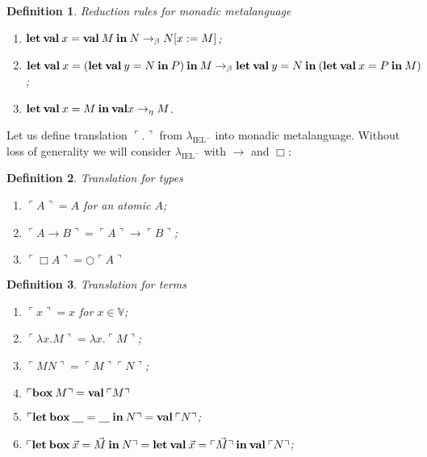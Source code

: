 \documentclass[a4paper]{article}
\newtheorem{defin}{Definition}
\begin{document}
\begin{defin} Reduction rules for monadic metalanguage
  \begin{enumerate}
    \item ${\bf let \: val \:} x = {\bf val \:} M {\: \bf in \:} N \rightarrow_{\beta} N [x := M]$;
    \item ${\bf let \: val \:} x = ({\bf let \: val \:} y = N {\: \bf in \:} P) {\: \bf in \:} M \rightarrow_{\beta} {\bf let \: val \:} y = N {\: \bf in \:} ({\bf let \: val \:} x = P {\: \bf in \:} M)$;
    \item ${\bf let \: val \:} x = M {\: \bf in \:} {\bf val} x \rightarrow_{\eta} M$.
  \end{enumerate}
\end{defin}

Let us define translation $\ulcorner . \urcorner$ from $\lambda_{\text{IEL}^{-}}$ into monadic metalanguage.
Without loss of generality we will consider $\lambda_{\text{IEL}^{-}}$ with $\to$ and $\Box$:

\begin{defin} Translation for types
  \begin{enumerate}
    \item $\ulcorner A \urcorner = A$ for an atomic $A$;
    \item $\ulcorner A \to B \urcorner = \ulcorner A \urcorner \to \ulcorner B \urcorner$;
    \item $\ulcorner \Box A \urcorner = \bigcirc \ulcorner A \urcorner$
  \end{enumerate}
\end{defin}

\begin{defin} Translation for terms
  \begin{enumerate}
    \item $\ulcorner x \urcorner = x$ for $x \in \mathbb{V}$;
    \item $\ulcorner \lambda x. M \urcorner = \lambda x. \ulcorner M \urcorner$;
    \item $\ulcorner M N \urcorner = \ulcorner M \urcorner \ulcorner N \urcorner$;
    \item $\ulcorner {\bf box \:} M \urcorner = {\bf val \:} \ulcorner M \urcorner$
    \item $\ulcorner {\bf let \: box \:} \underline{\quad} = \underline{\quad} {\: \bf in \:} N \urcorner = {\bf val \:} \ulcorner N \urcorner$;
    \item $\ulcorner {\bf let \: box \:} \vec{x} = \vec{M} {\: \bf in \:} N \urcorner = {\bf let \: val \:} \vec{x} = \ulcorner \vec{M} \urcorner {\: \bf in \:} {\bf val \:} \ulcorner N \urcorner$;
  \end{enumerate}
\end{defin}
\end{document}
